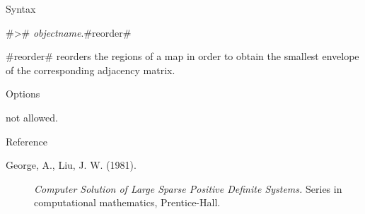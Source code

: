 \begin{stanza}{Syntax}

{#># {\em objectname}.#reorder#

#reorder# reorders the regions of a map in order to obtain the
smallest envelope of the corresponding adjacency matrix.}
\end{stanza}

\begin{stanza}{Options}

not allowed.
\end{stanza}

\begin{stanza}{Reference}

{\begin{description}

\item[George, A., Liu, J. W. (1981).] {\em Computer Solution of
Large Sparse Positive Definite Systems.} Series in computational
mathematics, Prentice-Hall.

\end{description}}
\end{stanza}
